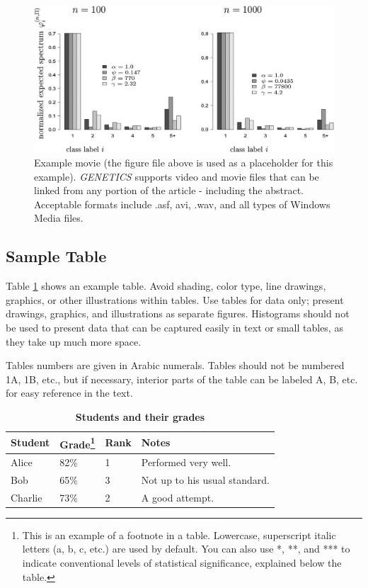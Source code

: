 \documentclass[9pt,twocolumn,twoside]{gsajnl}
\begin{document}
\begin{figure}[htbp]
\centering
\includegraphics[width=\linewidth]{example-figure}
\caption{Example movie (the figure file above is used as a placeholder for this example). \textit{GENETICS} supports video and movie files that can be linked from any portion of the article - including the abstract. Acceptable formats include .asf, avi, .wav, and all types of Windows Media files.   
}%
\label{video:spectrum}
\end{figure}


\subsection{Sample Table}

Table \ref{tab:shape-functions} shows an example table. Avoid shading, color type, line drawings, graphics, or other illustrations within tables. Use tables for data only; present drawings, graphics, and illustrations as separate figures. Histograms should not be used to present data that can be captured easily in text or small tables, as they take up much more space.  

Tables numbers are given in Arabic numerals. Tables should not be numbered 1A, 1B, etc., but if necessary, interior parts of the table can be labeled A, B, etc. for easy reference in the text.  


\begin{table}[htbp]
\centering
\caption{\bf Students and their grades}
\begin{tableminipage}{\textwidth}
\begin{tabularx}{\textwidth}{XXXX}
\hline
Student & Grade\footnote{This is an example of a footnote in a table. Lowercase, superscript italic letters (a, b, c, etc.) are used by default. You can also use *, **, and *** to indicate conventional levels of statistical significance, explained below the table.} & Rank & Notes \\
\hline
Alice & 82\% & 1 & Performed very well.\\
Bob & 65\% & 3 & Not up to his usual standard.\\
Charlie & 73\% & 2 & A good attempt.\\
\hline
\end{tabularx}
  \label{tab:shape-functions}
\end{tableminipage}
\end{table}
\end{document}
